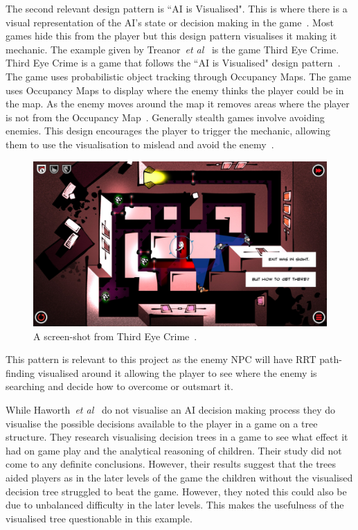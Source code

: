 \documentclass[journal]{IEEEtran}
\begin{document}
The second relevant design pattern is ``AI is Visualised".  This is where there is a visual representation of the AI's state or decision making in the game~\cite{treanor2015}. Most games hide this from the player but this design pattern visualises it making it mechanic.  
The example given by Treanor~\textit{et al}~\cite{treanor2015} is the game Third Eye Crime.  Third Eye Crime is a game that follows the ``AI is Visualised" design pattern~\cite{Isla2014,game:ThirdEyeCrime}. The game uses probabilistic object tracking through Occupancy Maps. The game uses Occupancy Maps to display where the enemy thinks the player could be in the map. As the enemy moves around the map it removes areas where the player is not from the Occupancy Map~\cite{Isla2014}.  Generally stealth games involve avoiding enemies.  This design encourages the player to trigger the mechanic, allowing them to use the visualisation to mislead and avoid the enemy~\cite{Isla2014,game:ThirdEyeCrime}. 

\begin{figure}[h]
	\includegraphics[width=1.0\linewidth]{ThirdEyeCrime.jpg}
	\caption{ A screen-shot from Third Eye Crime~\cite{game:ThirdEyeCrime}.}
	\label{image:ThirdEyeCrime}
\end{figure}  

This pattern is relevant to this project as the enemy NPC will have RRT path-finding visualised around it allowing the player to see where the enemy is searching and decide how to overcome or outsmart it.

While Haworth~\textit{et al}~\cite{Haworth2010} do not visualise an AI decision making process they do visualise the possible decisions available to the player in a game on a tree structure.   They research visualising decision trees in a game to see what effect it had on game play and the analytical reasoning of children.  
Their study did not come to any definite conclusions. However, their results suggest that the trees aided players as in the later levels of the game the children without the visualised decision tree struggled to beat the game. However, they noted this could also be due to unbalanced difficulty in the later levels. This makes the usefulness of the visualised tree questionable in this example.  
\end{document}
